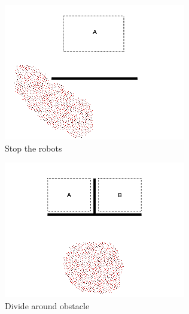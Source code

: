 \documentclass[]{article}
\begin{document}
\begin{figure}
\begin{subfigure}{0.42\textwidth}
		\includegraphics[width=\linewidth]{slide_images/Swarm_Robot_Control_-_1000_Robot_0007.png}
		\caption{Stop the robots}
		\label{fig:sub1}
	\end{subfigure}%
	\begin{subfigure}{0.42\textwidth}
		\centering
		\includegraphics[width=\linewidth]{slide_images/Swarm_Robot_Control_-_1000_Robot_0009.png}
		\caption{Divide around obstacle}
		\label{fig:sub2}
	\end{subfigure}
	\begin{subfigure}{0.42\textwidth}
		\centering

\end{subfigure}
\end{figure}
\end{document}

